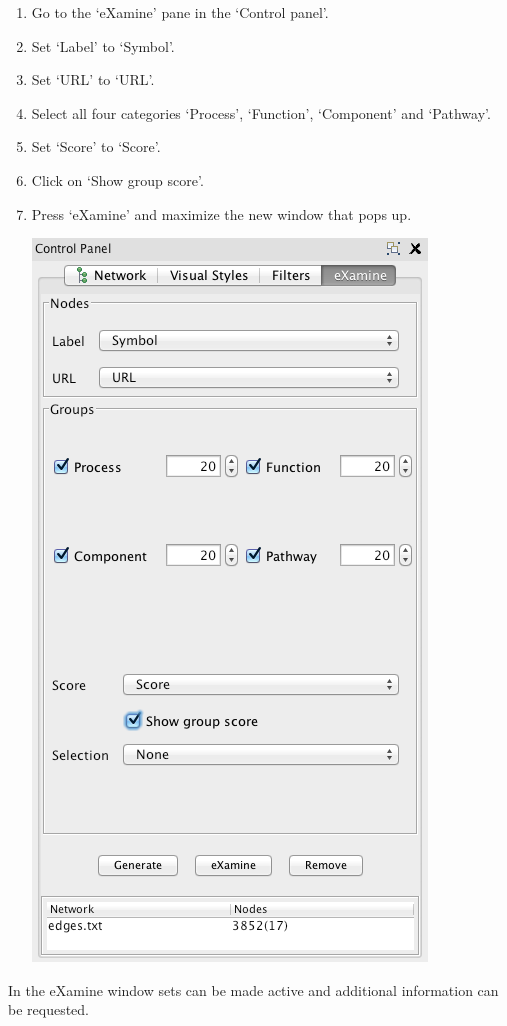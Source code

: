 \documentclass[a4paper,11pt]{article}
\begin{document}
\begin{enumerate}
  \item Go to the `eXamine' pane in the `Control panel'.
  \item Set `Label' to `Symbol'.
  \item Set `URL' to `URL'.
  \item Select all four categories `Process', `Function', `Component' and `Pathway'.
  \item Set `Score' to `Score'.
  \item Click on `Show group score'.
  \item Press `eXamine' and maximize the new window that pops up.
  \begin{center}
    \includegraphics[width=.4\textwidth]{images/5.png}
  \end{center}
\end{enumerate}

In the eXamine window sets can be made active and additional information can be
requested.
\end{document}
